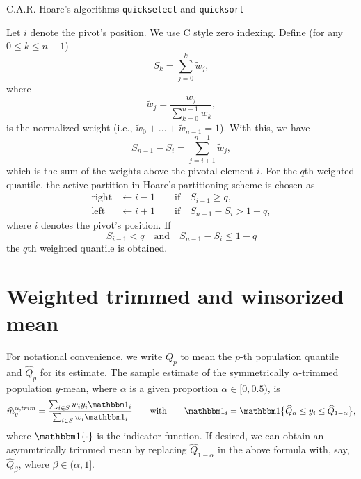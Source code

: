 \documentclass[a4paper,11pt]{scrreprt}
\theoremstyle{remark}
\begin{document}
C.A.R. Hoare's algorithms \texttt{quickselect} and \texttt{quicksort} \citep[see e.g.][p. 113--123, and Exercise 31 on p. 136]{knuth1998v3}


Let $i$ denote the pivot's position. We use C style zero indexing. Define (for any $0\leq k \leq n-1$)  
\begin{equation*}
   S_k = \sum_{j=0}^k \tilde{w}_j,
\end{equation*}
\noindent where 
\begin{equation*}
   \tilde{w}_j = \frac{w_j}{\sum_{k=0}^{n-1}w_k},
\end{equation*}
\noindent is the normalized weight (i.e., $\tilde{w}_0 + \ldots + \tilde{w}_{n-1} = 1$). With this, we have
\begin{equation*}
   S_{n-1} - S_i = \sum_{j=i+1}^{n-1}\tilde{w}_j,
\end{equation*}
\noindent which is the sum of the weights above the pivotal element $i$. For the $q$th weighted quantile, the active partition in Hoare's partitioning scheme is chosen as 
\begin{align*}
   \mathrm{right} &\leftarrow i - 1 \qquad \text{if} \quad  S_{i-1} \geq q, \\
   \mathrm{left} &\leftarrow i + 1  \qquad \text{if} \quad  S_{n-1} - S_{i} > 1-q,  
\end{align*}
\noindent where $i$ denotes the pivot's position. If 
\begin{equation*}
   S_{i-1} < q \quad \text{and} \quad  S_{n-1} - S_{i} \leq 1-q  
\end{equation*}
\noindent the $q$th weighted quantile is obtained. 

 

\section{Weighted trimmed and winsorized mean}
For notational convenience, we write $Q_p$ to mean the $p$-th population quantile and $\widehat{Q}_p$ for its estimate. The sample estimate of the symmetrically $\alpha$-trimmed population $y$-mean, where $\alpha$ is a given proportion $\alpha \in [0,0.5)$, is 
\begin{equation*}
   \widehat{m}_y^{\alpha, trim} =  \frac{\sum_{i \in S} w_i y_i  \indicator_i }{\sum_{i \in S} w_i \indicator_i} \qquad \text{with} \qquad  \indicator_i = \indicator \big\{\widehat{Q}_{\alpha} \leq y_i \leq \widehat{Q}_{1-\alpha} \big\},
\end{equation*}
\noindent  where $\indicator\{\cdot\}$ is the indicator function. If desired, we can obtain an asymmtrically trimmed mean by replacing $\widehat{Q}_{1-\alpha}$ in the above formula with, say, $\widehat{Q}_{\beta}$, where $\beta \in (\alpha, 1]$. 
\end{document}
